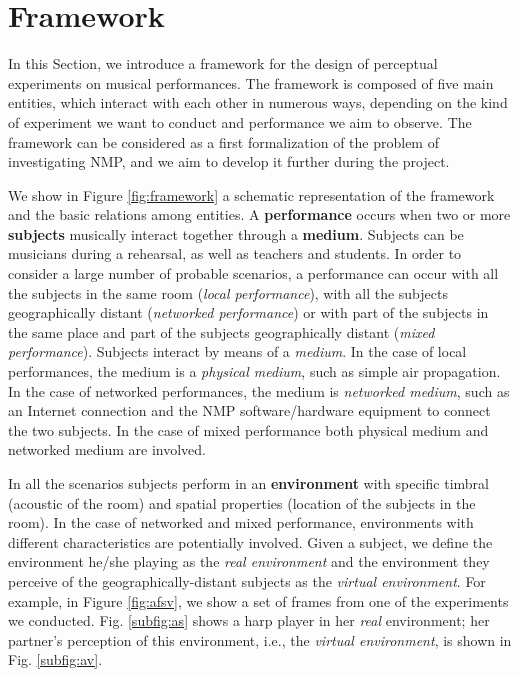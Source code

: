 \section{Framework}\label{sec:framework}
In this Section, we introduce a framework for the design of perceptual experiments on musical performances. The framework is composed of five main entities, which interact with each other in numerous ways, depending on the kind of experiment we want to conduct and performance we aim to observe. The framework can be considered as a first formalization of the problem of investigating NMP, and we aim to develop it further during the project.

We show in Figure \ref{fig:framework} a schematic representation of the framework and the basic relations among entities. A \textbf{performance} occurs when two or more \textbf{subjects} musically interact together through a \textbf{medium}. Subjects can be musicians during a rehearsal, as well as teachers and students. In order to consider a large number of probable scenarios, a performance can occur with all the subjects in the same room (\textit{local performance}), with all the subjects geographically distant (\textit{networked performance}) or with part of the subjects in the same place and part of the subjects geographically distant (\textit{mixed performance}). Subjects interact by means of a \textit{medium}. In the case of local performances, the medium is a \textit{physical medium}, such as simple air propagation. In the case of networked performances, the medium is \textit{networked medium}, such as an Internet connection and the NMP software/hardware equipment to connect the two subjects. In the case of mixed performance both physical medium and networked medium are involved. 

In all the scenarios subjects perform in an \textbf{environment} with specific timbral (acoustic of the room) and spatial properties (location of the subjects in the room). In the case of networked and mixed performance, environments with different characteristics are potentially involved. Given a subject, we define the environment he/she playing as the \textit{real environment} and the environment they perceive of the geographically-distant subjects as the \textit{virtual environment}. For example, in Figure \ref{fig:afsv}, we show a set of frames from one of the experiments we conducted. Fig. \ref{subfig:as} shows a harp player in her \textit{real} environment; her partner's perception of this environment, i.e., the \textit{virtual environment}, is shown in Fig. \ref{subfig:av}. 

